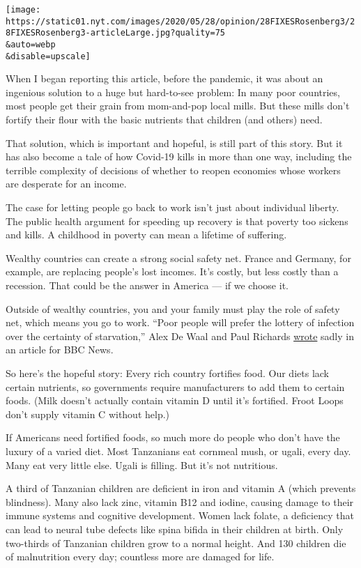 \texttt{[image: https://static01.nyt.com/images/2020/05/28/opinion/28FIXESRosenberg3/28FIXESRosenberg3-articleLarge.jpg?quality=75\\\&auto=webp\\\&disable=upscale]}

When I began reporting this article, before the pandemic, it was about
an ingenious solution to a huge but hard-to-see problem: In many poor
countries, most people get their grain from mom-and-pop local mills. But
these mills don't fortify their flour with the basic nutrients that
children (and others) need.

That solution, which is important and hopeful, is still part of this
story. But it has also become a tale of how Covid-19 kills in more than
one way, including the terrible complexity of decisions of whether to
reopen economies whose workers are desperate for an income.

The case for letting people go back to work isn't just about individual
liberty. The public health argument for speeding up recovery is that
poverty too sickens and kills. A childhood in poverty can mean a
lifetime of suffering.

Wealthy countries can create a strong social safety net. France and
Germany, for example, are replacing people's lost incomes. It's costly,
but less costly than a recession. That could be the answer in America
--- if we choose it.

Outside of wealthy countries, you and your family must play the role of
safety net, which means you go to work. ``Poor people will prefer the
lottery of infection over the certainty of starvation,'' Alex De Waal
and Paul Richards
\href{https://www.bbc.com/news/world-africa-52268320}{wrote} sadly in an
article for BBC News.

So here's the hopeful story: Every rich country fortifies food. Our
diets lack certain nutrients, so governments require manufacturers to
add them to certain foods. (Milk doesn't actually contain vitamin D
until it's fortified. Froot Loops don't supply vitamin C without help.)

If Americans need fortified foods, so much more do people who don't have
the luxury of a varied diet. Most Tanzanians eat cornmeal mush, or
ugali, every day. Many eat very little else. Ugali is filling. But it's
not nutritious.

A third of Tanzanian children are deficient in iron and vitamin A (which
prevents blindness). Many also lack zinc, vitamin B12 and iodine,
causing damage to their immune systems and cognitive development. Women
lack folate, a deficiency that can lead to neural tube defects like
spina bifida in their children at birth. Only two-thirds of Tanzanian
children grow to a normal height. And 130 children die of malnutrition
every day; countless more are damaged for life.

